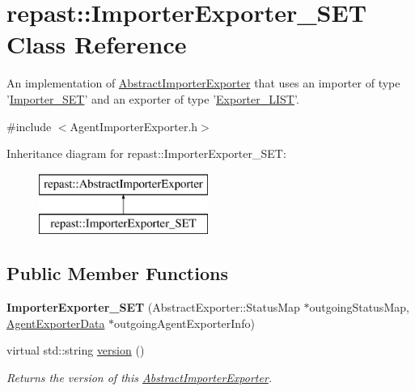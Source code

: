 \hypertarget{classrepast_1_1_importer_exporter___s_e_t}{\section{repast\-:\-:Importer\-Exporter\-\_\-\-S\-E\-T Class Reference}
\label{classrepast_1_1_importer_exporter___s_e_t}
}


An implementation of \hyperlink{classrepast_1_1_abstract_importer_exporter}{Abstract\-Importer\-Exporter} that uses an importer of type '\hyperlink{classrepast_1_1_importer___s_e_t}{Importer\-\_\-\-S\-E\-T}' and an exporter of type '\hyperlink{classrepast_1_1_exporter___l_i_s_t}{Exporter\-\_\-\-L\-I\-S\-T}'.  




{\ttfamily \#include $<$Agent\-Importer\-Exporter.\-h$>$}

Inheritance diagram for repast\-:\-:Importer\-Exporter\-\_\-\-S\-E\-T\-:\begin{figure}[H]
\begin{center}
\leavevmode
\includegraphics[height=2.000000cm]{classrepast_1_1_importer_exporter___s_e_t}
\end{center}
\end{figure}
\subsection*{Public Member Functions}
\begin{DoxyCompactItemize}
\item 
\hypertarget{classrepast_1_1_importer_exporter___s_e_t_a3cec27920ea93f83477f5b6a0aaf2c36}{{\bfseries Importer\-Exporter\-\_\-\-S\-E\-T} (Abstract\-Exporter\-::\-Status\-Map $\ast$outgoing\-Status\-Map, \hyperlink{classrepast_1_1_agent_exporter_data}{Agent\-Exporter\-Data} $\ast$outgoing\-Agent\-Exporter\-Info)}\label{classrepast_1_1_importer_exporter___s_e_t_a3cec27920ea93f83477f5b6a0aaf2c36}

\item 
virtual std\-::string \hyperlink{classrepast_1_1_importer_exporter___s_e_t_a94bcc5a0cb77c6550927663b04410ca2}{version} ()
\begin{DoxyCompactList}\small\item\em Returns the version of this \hyperlink{classrepast_1_1_abstract_importer_exporter}{Abstract\-Importer\-Exporter}. \end{DoxyCompactList}\end{DoxyCompactItemize}

